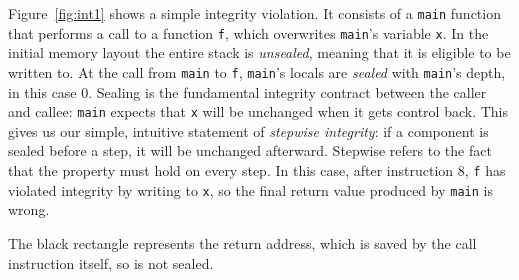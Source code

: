 \documentclass[acmsmall,review,anonymous]{acmart}\settopmatter{printfolios=true,printccs=false,printacmref=false}
\begin{document}
Figure~\ref{fig:int1} shows a simple integrity violation. It consists of a {\tt main}
function that performs a call to a function {\tt f}, which overwrites {\tt main}'s
variable {\tt x}. In the initial memory layout the entire stack is {\em unsealed},
meaning that it is eligible to be written to. At the call from {\tt main} to
{\tt f}, {\tt main}'s locals are {\em sealed} with {\tt main}'s depth,
in this case 0. Sealing is the fundamental integrity contract between the caller and callee:
{\tt main} expects that {\tt x} will be unchanged when it gets control back.
This gives us our simple, intuitive statement of {\em stepwise integrity}:
if a component is sealed before a step, it will be unchanged afterward. Stepwise
refers to the fact that the property must hold on every step. %
In this case, after instruction 8, {\tt f} has violated integrity by writing to {\tt x},
so the final return value produced by {\tt main} is wrong.

The black rectangle represents the return address, which is saved by the call
instruction itself, so is not sealed.
\end{document}
